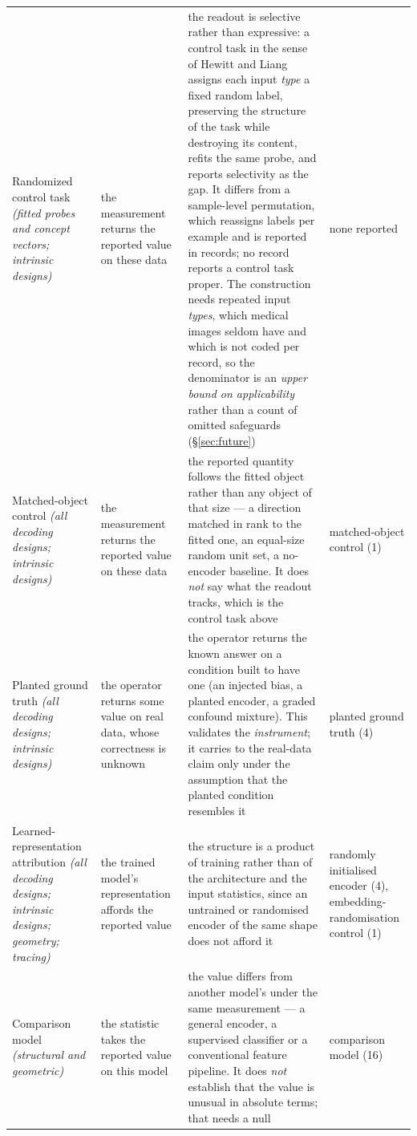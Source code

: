 \begin{table}
\begin{tabular}{@{}L{3.0cm}L{3.6cm}L{10.5cm}L{3.6cm}@{}}
Randomized control task \emph{(fitted probes and concept vectors; intrinsic designs)} & the measurement returns the reported value on these data & the readout is selective rather than expressive: a control task in the sense of Hewitt and Liang assigns each input \emph{type} a fixed random label, preserving the structure of the task while destroying its content, refits the same probe, and reports selectivity as the gap. It differs from a sample-level permutation, which reassigns labels per example and is reported in \Vperm{} records; no record reports a control task proper. The construction needs repeated input \emph{types}, which medical images seldom have and which is not coded per record, so the denominator is an \emph{upper bound on applicability} rather than a count of omitted safeguards (\S\ref{sec:future}) & none reported \\
Matched-object control \emph{(all decoding designs; intrinsic designs)} & the measurement returns the reported value on these data & the reported quantity follows the fitted object rather than any object of that size --- a direction matched in rank to the fitted one, an equal-size random unit set, a no-encoder baseline. It does \emph{not} say what the readout tracks, which is the control task above & matched-object control (1) \\
Planted ground truth \emph{(all decoding designs; intrinsic designs)} & the operator returns some value on real data, whose correctness is unknown & the operator returns the known answer on a condition built to have one (an injected bias, a planted encoder, a graded confound mixture). This validates the \emph{instrument}; it carries to the real-data claim only under the assumption that the planted condition resembles it & planted ground truth (4) \\
Learned-representation attribution \emph{(all decoding designs; intrinsic designs; geometry; tracing)} & the trained model's representation affords the reported value & the structure is a product of training rather than of the architecture and the input statistics, since an untrained or randomised encoder of the same shape does not afford it & randomly initialised encoder (4), embedding-randomisation control (1) \\
Comparison model \emph{(structural and geometric)} & the statistic takes the reported value on this model & the value differs from another model's under the same measurement --- a general encoder, a supervised classifier or a conventional feature pipeline. It does \emph{not} establish that the value is unusual in absolute terms; that needs a null & comparison model (16) \\

\end{tabular}
\end{table}

